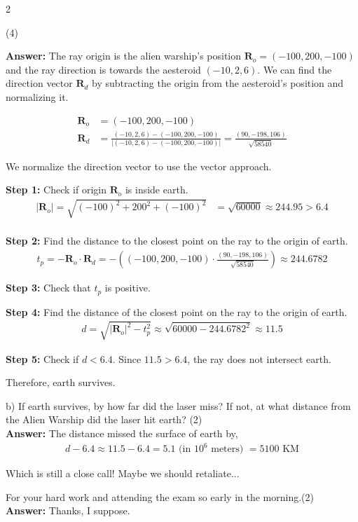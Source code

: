 \documentclass[11pt,answers]{exam}
\begin{document}
\begin{questions}
{\begin{multicols}{2}
\begin{tikzpicture}
\end{tikzpicture}
\end{multicols}
\hfill (4)

\textbf{Answer:}
The ray origin is the alien warship's position $\mathbf{R}_o = (-100, 200, -100)$ and the ray direction is towards the aesteroid $(-10, 2, 6)$. We can find the direction vector $\mathbf{R}_d$ by subtracting the origin from the aesteroid's position and normalizing it.

\begin{align*}
\mathbf{R}_o &= (-100, 200, -100) \\
\mathbf{R}_d &= \frac{(-10, 2, 6) - (-100, 200, -100)}{|(-10, 2, 6) - (-100, 200, -100)| }= \frac{(90, -198, 106)}{\sqrt{58540}}
\end{align*}

We normalize the direction vector to use the vector approach.

\textbf{Step 1:} Check if origin $\mathbf{R}_o$ is inside earth.
\begin{align*}
|\mathbf{R}_o| = \sqrt{(-100)^2 + 200^2 + (-100)^2} &= \sqrt{60000} \approx 244.95 > 6.4 \\
\end{align*}

\textbf{Step 2:} Find the distance to the closest point on the ray to the origin of earth.
\begin{align*}
t_p = - \mathbf{R}_o \cdot \mathbf{R}_d = - \left((-100, 200, -100) \cdot \frac{(90, -198, 106)}{\sqrt{58540}}\right) \approx 244.6782
\end{align*}

\textbf{Step 3:} Check that $t_p$ is positive.

\textbf{Step 4:} Find the distance of the closest point on the ray to the origin of earth.
\begin{align*}
d = \sqrt{|\mathbf{R}_o|^2 - t_p^2} \approx \sqrt{60000 - 244.6782^2} \approx 11.5
\end{align*}

\textbf{Step 5:} Check if $d < 6.4$. Since $11.5 > 6.4$, the ray does not intersect earth.

Therefore, earth survives.

\vspace{4cm}

b) If earth survives, by how far did the laser miss? If not, at what distance from the Alien Warship did the laser hit earth?
\hfill (2) \\

\textbf{Answer:}
The distance missed the surface of earth by,
\begin{align*}
d - 6.4 \approx 11.5 - 6.4 = 5.1 \text{ (in $10^6$ meters) } = 5100 \text{ KM}
\end{align*}
}

Which is still a close call! Maybe we should retaliate...

\vspace{4cm}

\question[]For your hard work and attending the exam so early in the morning.\hfill (2) \\
\textbf{Answer:} Thanks, I suppose.
\end{questions}
\end{document}
